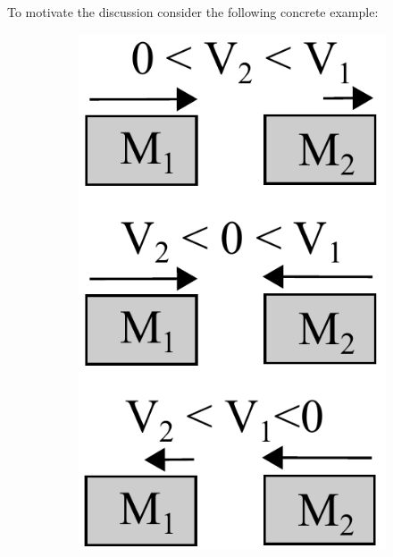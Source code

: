 \documentclass[letterpaper]{article}
\begin{document}
To motivate the discussion consider the following concrete example:  
\begin{figure}
\begin{center}
\begin{center}
\quad
\begin{subfigure}{0.19\linewidth}
                \includegraphics[width=1\linewidth]{Figs/little-momentum0.pdf}
                \caption{}

\end{subfigure}
\end{center}
\end{center}
\end{figure}
\end{document}
